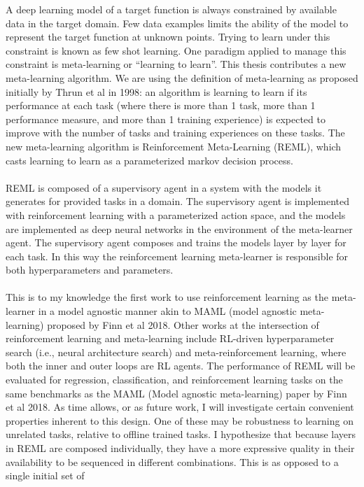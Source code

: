 A deep learning model of a target function is always constrained by available data 
in the target domain. Few data examples limits the ability of the model to 
represent the target function at unknown points. Trying to learn under this 
constraint is known as few shot learning. One paradigm applied to manage this 
constraint is meta-learning or ``learning to learn''. This thesis contributes a 
new meta-learning algorithm. We are using the definition of meta-learning as 
proposed initially by Thrun et al in 1998: an algorithm is learning to learn if 
its performance at each task (where there is more than 1 task, more than 1 
performance measure, and more than 1 training experience) is expected to improve 
with the number of tasks and training experiences on these tasks. The new 
meta-learning algorithm is Reinforcement Meta-Learning (REML), which casts learning 
to learn as a parameterized markov decision process.
\\\\
REML is composed of a supervisory agent in a system with the models it generates 
for provided tasks in a domain. The supervisory agent is implemented with 
reinforcement learning with a parameterized action space, and the  models are 
implemented as deep neural networks in the environment of the meta-learner agent. 
The supervisory agent composes and trains the models layer by layer for each task. 
In this way the reinforcement learning meta-learner is responsible for both 
hyperparameters and parameters. 
\\\\
This is to my knowledge the first work to use reinforcement learning as the 
meta-learner in a model agnostic manner akin to MAML (model agnostic meta-learning) 
proposed by Finn et al 2018.  Other works at the intersection of reinforcement 
learning and meta-learning include RL-driven hyperparameter search (i.e., neural 
architecture search) and meta-reinforcement learning, where both the inner and outer 
loops are RL agents. The performance of REML will be evaluated for regression, 
classification, and reinforcement learning tasks on the same benchmarks as the MAML 
(Model agnostic meta-learning) paper by Finn et al 2018. As time allows, or as 
future work, I will investigate certain convenient properties inherent to this 
design. One of these may be robustness to learning on unrelated tasks, relative to 
offline trained tasks. I hypothesize that because layers in REML are composed 
individually, they have a more expressive quality in their availability to be 
sequenced in different combinations. This is as opposed to a single initial set of 
